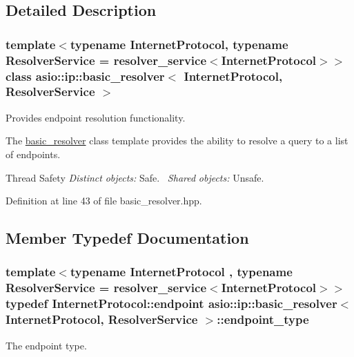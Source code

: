 \subsection{Detailed Description}
\subsubsection*{template$<$typename Internet\+Protocol, typename Resolver\+Service = resolver\+\_\+service$<$\+Internet\+Protocol$>$$>$class asio\+::ip\+::basic\+\_\+resolver$<$ Internet\+Protocol, Resolver\+Service $>$}

Provides endpoint resolution functionality. 

The \hyperlink{classasio_1_1ip_1_1basic__resolver}{basic\+\_\+resolver} class template provides the ability to resolve a query to a list of endpoints.

\begin{DoxyParagraph}{Thread Safety}
{\itshape Distinct} {\itshape objects\+:} Safe.~\newline
{\itshape Shared} {\itshape objects\+:} Unsafe. 
\end{DoxyParagraph}


Definition at line 43 of file basic\+\_\+resolver.\+hpp.



\subsection{Member Typedef Documentation}
\hypertarget{classasio_1_1ip_1_1basic__resolver_a4623878755f70037e875778a0696da9e}{}
\subsubsection[{endpoint\+\_\+type}]{\setlength{\rightskip}{0pt plus 5cm}template$<$typename Internet\+Protocol , typename Resolver\+Service  = resolver\+\_\+service$<$\+Internet\+Protocol$>$$>$ typedef Internet\+Protocol\+::endpoint {\bf asio\+::ip\+::basic\+\_\+resolver}$<$ Internet\+Protocol, Resolver\+Service $>$\+::{\bf endpoint\+\_\+type}}\label{classasio_1_1ip_1_1basic__resolver_a4623878755f70037e875778a0696da9e}


The endpoint type. 



